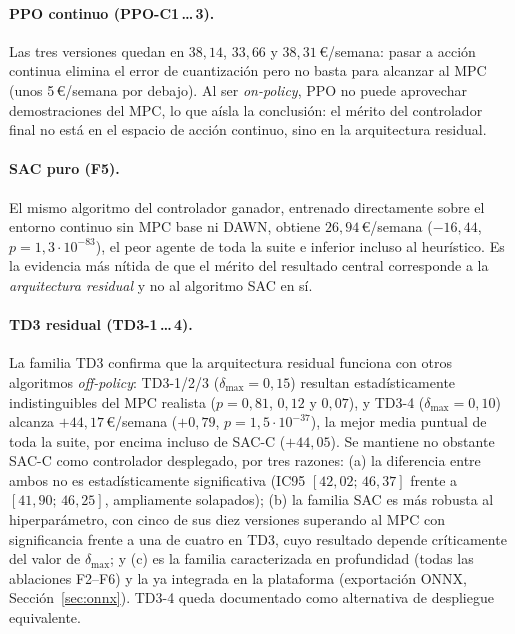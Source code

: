 \documentclass[12pt, a4paper, twoside]{report}
\begin{document}
\paragraph{PPO continuo (PPO-C1\,\ldots\,3).} Las tres versiones quedan en
$38{,}14$, $33{,}66$ y $38{,}31$\,€/semana: pasar a acción continua elimina el
error de cuantización pero no basta para alcanzar al MPC (unos 5\,€/semana por
debajo). Al ser \textit{on-policy}, PPO no puede aprovechar demostraciones del
MPC, lo que aísla la conclusión: el mérito del controlador final no está en el
espacio de acción continuo, sino en la arquitectura residual.

\paragraph{SAC puro (F5).} El mismo algoritmo del controlador ganador,
entrenado directamente sobre el entorno continuo sin MPC base ni DAWN, obtiene
$26{,}94$\,€/semana ($-16{,}44$, $p=1{,}3\cdot10^{-83}$), el peor agente de
toda la suite e inferior incluso al heurístico. Es la evidencia más nítida de
que el mérito del resultado central corresponde a la \emph{arquitectura
residual} y no al algoritmo SAC en sí.

\paragraph{TD3 residual (TD3-1\,\ldots\,4).} La familia TD3 confirma que la
arquitectura residual funciona con otros algoritmos \textit{off-policy}:
TD3-1/2/3 ($\delta_{\max}=0{,}15$) resultan estadísticamente indistinguibles
del MPC realista ($p=0{,}81$, $0{,}12$ y $0{,}07$), y TD3-4
($\delta_{\max}=0{,}10$) alcanza $+44{,}17$\,€/semana ($+0{,}79$,
$p=1{,}5\cdot10^{-37}$), la mejor media puntual de toda la suite, por encima
incluso de SAC-C ($+44{,}05$). Se mantiene no obstante SAC-C como controlador
desplegado, por tres razones: (a) la diferencia entre ambos no es
estadísticamente significativa (IC95 $[42{,}02;\,46{,}37]$ frente a
$[41{,}90;\,46{,}25]$, ampliamente solapados); (b) la familia SAC es más
robusta al hiperparámetro, con cinco de sus diez versiones superando al MPC
con significancia frente a una de cuatro en TD3, cuyo resultado depende
críticamente del valor de $\delta_{\max}$; y (c) es la familia caracterizada
en profundidad (todas las ablaciones F2--F6) y la ya integrada en la
plataforma (exportación ONNX, Sección~\ref{sec:onnx}). TD3-4 queda documentado
como alternativa de despliegue equivalente.
\end{document}
